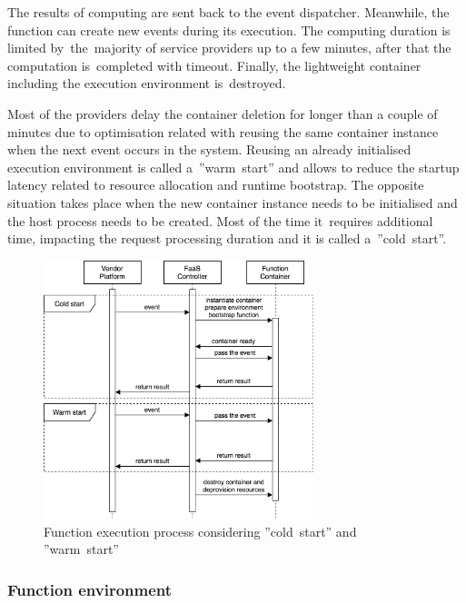 The results of computing are sent back to the event dispatcher. Meanwhile, the function can create new events during its execution. The computing duration is limited by~the~majority of service providers up to a few minutes, after that the computation is~completed with timeout. Finally, the lightweight container including the execution environment is~destroyed.

Most of the providers delay the container deletion for longer than a couple of minutes due to optimisation related with reusing the same container instance when the next event occurs in the system. Reusing an already initialised execution environment is called a~''warm~start'' and allows to reduce the startup latency related to resource allocation and runtime bootstrap. The opposite situation takes place when the new container instance needs to be initialised and the host process needs to be created. Most of the time it~requires additional time, impacting the request processing duration and it is called a~''cold~start''.

\begin{figure}[h]
    \centering
    \includegraphics[width=0.7\textwidth]{assets/02-serverless/ServerlessExecution.png}
    \caption{Function execution process considering ''cold~start'' and ''warm~start''}
    \label{fig:function-execution-process}
\end{figure}


\subsubsection{Function environment} \label{section:serverless-function-environment}

